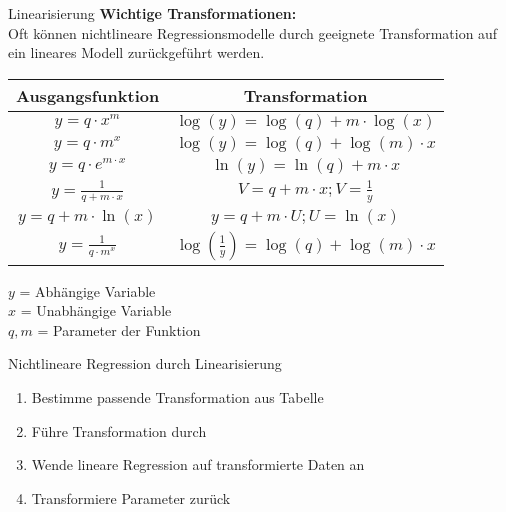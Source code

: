 \begin{concept}{Linearisierung} \textbf{Wichtige Transformationen:}\\
Oft können nichtlineare Regressionsmodelle durch geeignete Transformation auf ein lineares Modell zurückgeführt werden.
\begin{center}
\begin{tabular}{|c|c|}
\hline
Ausgangsfunktion & Transformation \\
\hline
$y = q \cdot x^m$ & $\log(y) = \log(q) + m \cdot \log(x)$ \\
\hline
$y = q \cdot m^x$ & $\log(y) = \log(q) + \log(m) \cdot x$ \\
\hline
$y = q \cdot e^{m \cdot x}$ & $\ln(y) = \ln(q) + m \cdot x$ \\
\hline
$y = \frac{1}{q+m \cdot x}$ & $V = q + m \cdot x; V = \frac{1}{y}$ \\
\hline
$y = q + m \cdot \ln(x)$ & $y = q + m \cdot U; U = \ln(x)$ \\
\hline
$y = \frac{1}{q \cdot m^x}$ & $\log(\frac{1}{y}) = \log(q) + \log(m) \cdot x$ \\
\hline
\end{tabular}
\end{center}
$y$ = Abhängige Variable\\
$x$ = Unabhängige Variable\\
$q, m$ = Parameter der Funktion
\end{concept}

\begin{KR}{Nichtlineare Regression durch Linearisierung}
\begin{enumerate}
  \item Bestimme passende Transformation aus Tabelle
  \item Führe Transformation durch
  \item Wende lineare Regression auf transformierte Daten an
  \item Transformiere Parameter zurück
\end{enumerate}
\end{KR}

